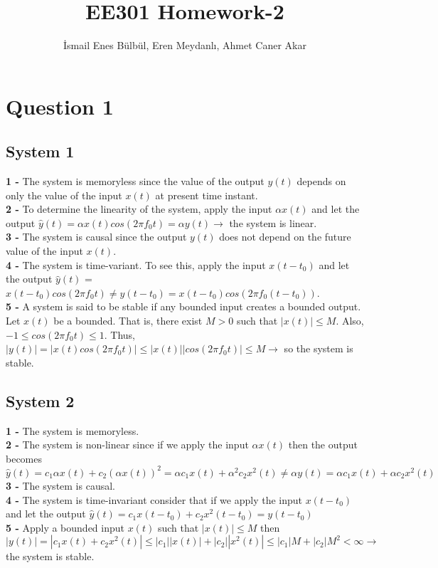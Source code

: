 \documentclass[12pt]{article}
\title{EE301 Homework-2}
\author{İsmail Enes Bülbül, Eren Meydanlı, Ahmet Caner Akar}
\begin{document}
\maketitle


    \section*{Question 1}
    \subsection*{System 1}
    \textbf{1 - }The system is memoryless since the value of the output \(y(t)\) depends on
    only the value of the input \(x(t)\) at present time instant.\\
    \textbf{2 - }To determine the linearity of the system, apply the input \(\alpha x(t)\) and let the
    output \(\hat{y}(t)=\alpha x(t)cos(2\pi f_0t)=\alpha y(t) \longrightarrow\) the system is linear.\\
    \textbf{3 - }The system is causal since the output \(y(t)\) does not depend on the future
    value of the input \(x(t)\).\\
    \textbf{4 - }The system is time-variant. To see this, apply the input \(x(t-t_0)\) and let the
    output \(\hat{y}(t)\) = \(x(t-t_0)cos(2\pi f_0t) \neq  y(t-t_0) = x(t-t_0)  cos(2\pi f_0(t-t_0))\).\\ 
    \textbf{5 - }A system is said to be stable if any bounded input creates a bounded
    output. Let \(x(t)\) be a bounded. That is, there exist \(M > 0\) such that \(\left\lvert x(t)\right\rvert \leq  M\).
    Also, \(-1 \leq cos(2\pi f_0t) \leq 1\). Thus, \(\left\lvert y(t)\right\rvert  = \left\lvert x(t)cos(2\pi f_0t)\right\rvert  \leq \left\lvert x(t)\right\rvert \left\lvert cos(2\pi f_0t)\right\rvert  \leq M \longrightarrow \) so the system is stable. \\
    \subsection*{System 2}
    \textbf{1 - }The system is memoryless.\\
    \textbf{2 - }The system is non-linear since if we apply the input \(\alpha x(t)\) then the output
    becomes 
    \(\hat{y}(t) = c_1\alpha x(t) + c_2(\alpha x(t))^2 = \alpha c_1x(t) + \alpha^2 c_2x^2(t) \neq \alpha y(t) = \alpha c_1x(t) + \alpha c_2x^2(t)\) \\
    \textbf{3 - }The system is causal. \\
    \textbf{4 - }The system is time-invariant consider that if we apply the input \(x(t-t_0)\) and
    let the output \(\hat{y}(t)=c_1x(t-t_0) + c_2x^2(t-t_0) = y(t-t_0)\)\\
    \textbf{5 - }Apply a bounded input \(x(t)\) such that \(\left\lvert x(t)\right\rvert \leq M\) then 
    \(\left\lvert y(t)\right\rvert  = \left\lvert c_1x(t) + c_2x^2(t)\right\rvert \leq \left\lvert c_1\right\rvert \left\lvert x(t)\right\rvert  + \left\lvert c_2\right\rvert \left\lvert x^2(t)\right\rvert  \leq \left\lvert c_1\right\rvert M + \left\lvert c_2\right\rvert M^2 < \infty \longrightarrow\) the system is stable.\\
\end{document}

